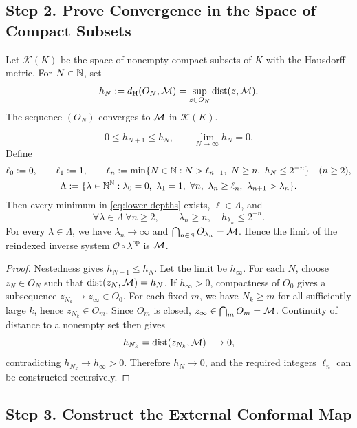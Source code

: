 \subsection{Step 2. Prove Convergence in the Space of Compact Subsets}

\begin{definition}
\label{def:outer-distance}
Let \(\mathcal K(K)\) be the space of nonempty compact subsets of \(K\)
with the Hausdorff metric. For \(N\in\mathbb N\), set
\[
 h_N:=d_{\mathrm H}(O_N,\mathcal M)
     =\sup_{z\in O_N}\operatorname{dist}(z,\mathcal M).
\]
The sequence \((O_N)\) converges to \(\mathcal M\) in \(\mathcal K(K)\).
\end{definition}

\begin{theorem}\label{thm:outer-distance}
\[
 0\le h_{N+1}\le h_N,\qquad \lim_{N\to\infty}h_N=0.
\]
Define
\begin{gather}
 \ell_0:=0,\qquad\ell_1:=1,\qquad
 \ell_n:=\min\{N\in\mathbb N:N>\ell_{n-1},\ N\ge n,\ h_N\le2^{-n}\}
 \quad(n\ge2),\label{eq:lower-depths}\\
 \Lambda:=
 \{\lambda\in\mathbb N^\mathbb N:
   \lambda_0=0,\ \lambda_1=1,\
   \forall n,\ \lambda_n\ge\ell_n,\
   \lambda_{n+1}>\lambda_n\}.
 \label{eq:depth-class}
\end{gather}
Then every minimum in \eqref{eq:lower-depths} exists,
\(\ell\in\Lambda\), and
\[
 \forall\lambda\in\Lambda\ \forall n\ge2,\qquad
 \lambda_n\ge n,\quad h_{\lambda_n}\le2^{-n}.
\]
For every \(\lambda\in\Lambda\), we have \(\lambda_n\to\infty\) and
\(\bigcap_{n\in\mathbb N}O_{\lambda_n}=\mathcal M\). Hence the limit of the reindexed
inverse system \(\mathcal O\circ\lambda^{\mathrm{op}}\) is \(\mathcal M\).
\end{theorem}
\begin{proof}
Nestedness gives \(h_{N+1}\le h_N\). Let the limit be \(h_\infty\).
For each \(N\), choose \(z_N\in O_N\) such that
\(\operatorname{dist}(z_N,\mathcal M)=h_N\). If \(h_\infty>0\), compactness of \(O_0\)
gives a subsequence \(z_{N_k}\to z_\infty\in O_0\). For each fixed
\(m\), we have \(N_k\ge m\) for all sufficiently large \(k\), hence
\(z_{N_k}\in O_m\). Since \(O_m\) is closed,
\(z_\infty\in\bigcap_mO_m=\mathcal M\). Continuity of distance to a nonempty
set then gives
\[
 h_{N_k}=\operatorname{dist}(z_{N_k},\mathcal M)\longrightarrow0,
\]
contradicting \(h_{N_k}\to h_\infty>0\). Therefore \(h_N\to0\), and
the required integers \(\ell_n\) can be constructed recursively.
\end{proof}

\subsection{Step 3. Construct the External Conformal Map}

